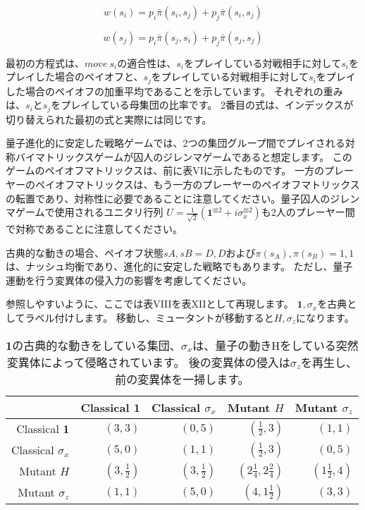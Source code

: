 \begin{equation}
\label{173}
w(s_i) =
p_i \bar{\pi} (s_i, s_j) + p_j \bar{\pi} (s_i, s_j)
\end{equation}

\begin{equation}
\label{174}
w(s_j) =
p_i \bar{\pi} (s_j, s_i) + p_j \bar{\pi} (s_j, s_j)  
\end{equation}

最初の方程式は、$move \  s_i$の適合性は、$s_i$をプレイしている対戦相手に対して$s_i$をプレイした場合のペイオフと、$s_j$をプレイしている対戦相手に対して$s_i$をプレイした場合のペイオフの加重平均であることを示しています。 それぞれの重みは、$s_i$と$s_j$をプレイしている母集団の比率です。 2番目の式は、インデックスが切り替えられた最初の式と実際には同じです。

量子進化的に安定した戦略ゲームでは、2つの集団グループ間でプレイされる対称バイマトリックスゲームが囚人のジレンマゲームであると想定します。 このゲームのペイオフマトリックスは、前に表VIに示したものです。 一方のプレーヤーのペイオフマトリックスは、もう一方のプレーヤーのペイオフマトリックスの転置であり、対称性に必要であることに注意してください。量子囚人のジレンマゲームで使用されるユニタリ行列 $ U = \frac{1}{\sqrt{2}}(\mathbf{1}^{\otimes 2}  + i \sigma_x^{\otimes 2} )  $も2人のプレーヤー間で対称であることに注意してください。

古典的な動きの場合、ペイオフ状態$ {sA, sB} = {D,D}$および${\pi(s_A), \pi(s_B)} = {1,1}$は、ナッシュ均衡であり、進化的に安定した戦略でもあります。 ただし、量子運動を行う変異体の侵入力の影響を考慮してください。

参照しやすいように、ここでは表VIIIを表XIIとして再現します。 ${\mathbf{1}, \sigma_x}$を古典としてラベル付けします。
移動し、ミュータントが移動すると${H, \sigma_z}$になります。

\begin{table}[htb]
\caption{$\mathbf{1}$の古典的な動きをしている集団、$\sigma_x$は、量子の動きHをしている突然変異体によって侵略されています。 後の変異体の侵入は$\sigma_z$を再生し、前の変異体を一掃します。}
\centering
\begin{tabular}{|r|r|r|r|r|} \hline
 & Classical $\mathbf{1}$ & Classical $\sigma_x$ & Mutant $H$ & Mutant $\sigma_z$ \\ \hline
Classical $\mathbf{1}$ & $(3,3)$ &  $(0,5)$ &  $(\frac{1}{2},3)$ & $(1,1)$  \\
Classical $\sigma_x$ &  $(5,0)$ &  $(1,1)$ &  $(\frac{1}{2},3)$ & $(0,5)$  \\
Mutant $H$  & $(3,\frac{1}{2})$ &  $(3,\frac{1}{2})$ &  $(2 \frac{1}{4},2 \frac{2}{4})$ & $(1 \frac{1}{2},4)$  \\
Mutant $\sigma_z$ & $(1,1)$ &  $(5,0)$ &  $(4, 1 \frac{1}{2})$ & $(3,3)$  \\   \hline
\end{tabular}
\end{table} 

